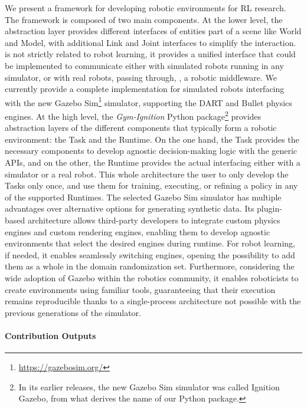 We present a framework for developing robotic environments for \acl{RL} research.
The framework is composed of two main components.
At the lower level, the \scenario \cpp abstraction layer provides different interfaces of entities part of a scene like World and Model, with additional Link and Joint interfaces to simplify the interaction.
\scenario is not strictly related to robot learning, it provides a unified interface that could be implemented to communicate either with simulated robots running in any simulator, or with real robots, passing through, \eg, a robotic middleware.
We currently provide a complete implementation for simulated robots interfacing with the new Gazebo Sim\footnote{\url{https://gazebosim.org/}} simulator, supporting the DART and Bullet physics engines.
At the high level, the \emph{Gym-Ignition} Python package\footnote{In its earlier releases, the new Gazebo Sim simulator was called Ignition Gazebo, from what derives the name of our Python package.} provides abstraction layers of the different components that typically form a robotic environment: the Task and the Runtime.
On the one hand, the Task provides the necessary components to develop agnostic decision-making logic with the generic \scenario \acp{API}, and on the other, the Runtime provides the actual interfacing either with a simulator or a real robot.
This whole architecture the user to only develop the Tasks only once, and use them for training, executing, or refining a policy in any of the supported Runtimes.
The selected Gazebo Sim simulator has multiple advantages over alternative options for generating synthetic data.
Its plugin-based architecture allows third-party developers to integrate custom physics engines and custom rendering engines, enabling them to develop agnostic environments that select the desired engines during runtime.
For robot learning, if needed, it enables seamlessly switching engines, opening the possibility to add them as a whole in the domain randomization set.
Furthermore, considering the wide adoption of Gazebo within the robotics community, it enables roboticists to create environments using familiar tools, guaranteeing that their execution remains reproducible thanks to a single-process architecture not possible with the previous generations of the simulator.

\paragraph{Contribution Outputs}

